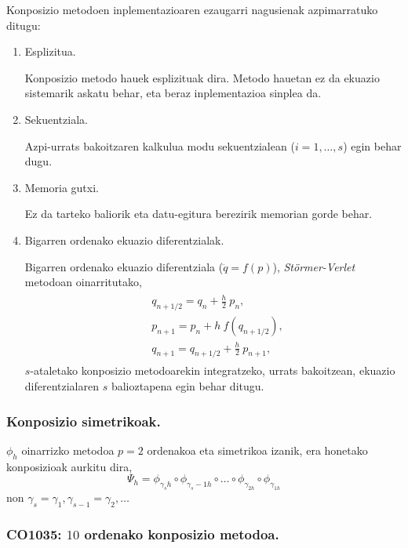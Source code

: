 Konposizio metodoen inplementazioaren ezaugarri nagusienak azpimarratuko ditugu:
\begin{enumerate}
\item{Esplizitua.}

Konposizio metodo hauek esplizituak dira. Metodo hauetan ez da ekuazio sistemarik askatu behar, eta beraz inplementazioa sinplea da. 

\item{Sekuentziala.}

Azpi-urrats bakoitzaren kalkulua modu sekuentzialean ($i=1,\dots,s$) egin behar dugu.

\item{Memoria gutxi.}

Ez da tarteko baliorik eta datu-egitura berezirik memorian gorde behar.   

\item{Bigarren ordenako ekuazio diferentzialak.}

Bigarren ordenako ekuazio diferentziala ($\ddot{q}=f(p)$), \emph{Störmer-Verlet} metodoan oinarritutako, 
\begin{align}
\begin{split}
&q_{{n+1}/{2}}=q_n+\frac{h}{2} \ p_n,\\
&p_{n+1}=p_n+h \ f(q_{{n+1}/{2}}),\\
&q_{n+1}=q_{{n+1}/{2}}+\frac{h}{2} \ p_{n+1},
\end{split}
\label{eq:stverlet}
\end{align}
$s$-ataletako konposizio metodoarekin integratzeko, urrats bakoitzean, ekuazio diferentzialaren $s$ balioztapena egin behar ditugu.

\end{enumerate}

\subsubsection*{Konposizio simetrikoak.}

$\phi_h$ oinarrizko metodoa $p=2$ ordenakoa eta simetrikoa izanik, era honetako konposizioak aurkitu dira,
\begin{equation}
\Psi_h=\phi_{\gamma_s h} \circ \phi_{\gamma_s-1 h} \circ \dots \circ \phi_{\gamma_{2 h}} \circ \phi_{\gamma_{1 h}} 
\end{equation}
non $\gamma_s=\gamma_1, \gamma_{s-1}=\gamma_2,\dots$ 

\subsubsection*{CO1035: $10$ ordenako konposizio metodoa.}

